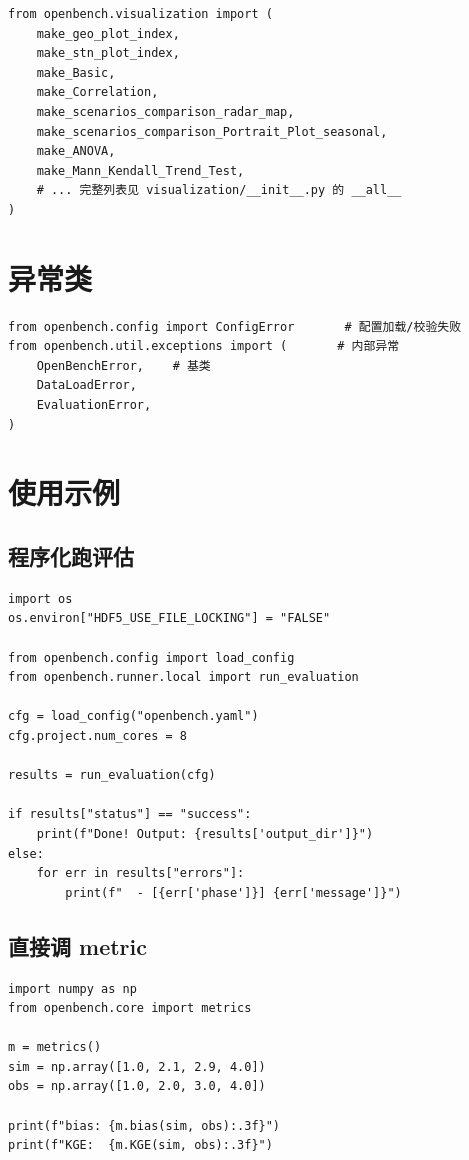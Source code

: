 \begin{verbatim}
from openbench.visualization import (
    make_geo_plot_index,
    make_stn_plot_index,
    make_Basic,
    make_Correlation,
    make_scenarios_comparison_radar_map,
    make_scenarios_comparison_Portrait_Plot_seasonal,
    make_ANOVA,
    make_Mann_Kendall_Trend_Test,
    # ... 完整列表见 visualization/__init__.py 的 __all__
)
\end{verbatim}

\section{异常类}

\begin{verbatim}
from openbench.config import ConfigError       # 配置加载/校验失败
from openbench.util.exceptions import (       # 内部异常
    OpenBenchError,    # 基类
    DataLoadError,
    EvaluationError,
)
\end{verbatim}

\section{使用示例}

\subsection{程序化跑评估}

\begin{verbatim}
import os
os.environ["HDF5_USE_FILE_LOCKING"] = "FALSE"

from openbench.config import load_config
from openbench.runner.local import run_evaluation

cfg = load_config("openbench.yaml")
cfg.project.num_cores = 8

results = run_evaluation(cfg)

if results["status"] == "success":
    print(f"Done! Output: {results['output_dir']}")
else:
    for err in results["errors"]:
        print(f"  - [{err['phase']}] {err['message']}")
\end{verbatim}

\subsection{直接调 metric}

\begin{verbatim}
import numpy as np
from openbench.core import metrics

m = metrics()
sim = np.array([1.0, 2.1, 2.9, 4.0])
obs = np.array([1.0, 2.0, 3.0, 4.0])

print(f"bias: {m.bias(sim, obs):.3f}")
print(f"KGE:  {m.KGE(sim, obs):.3f}")
\end{verbatim}

